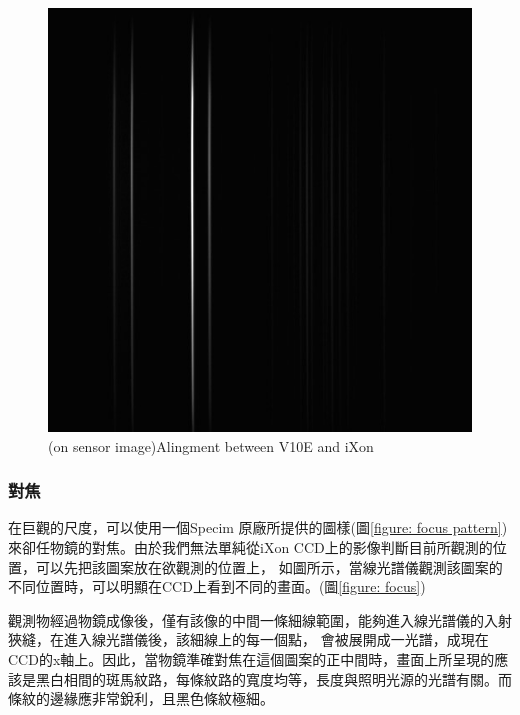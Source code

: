 \documentclass[12pt]{article}
\begin{document}
    \begin{figure}[t]
        \centering
        \includegraphics[width=0.8\linewidth]{0423withoutobf.jpg}
        \caption{(on sensor image)Alingment between V10E and iXon}
        \label{figure: align v10e and ixon}
    \end{figure}

    \subsubsection{對焦}
    在巨觀的尺度，可以使用一個Specim 原廠所提供的圖樣(圖\ref{figure: focus pattern})來卻任物鏡的對焦。由於我們無法單純從iXon CCD上的影像判斷目前所觀測的位置，可以先把該圖案放在欲觀測的位置上，
    如圖所示，當線光譜儀觀測該圖案的不同位置時，可以明顯在CCD上看到不同的畫面。(圖\ref{figure: focus})

    觀測物經過物鏡成像後，僅有該像的中間一條細線範圍，能夠進入線光譜儀的入射狹縫，在進入線光譜儀後，該細線上的每一個點，
    會被展開成一光譜，成現在CCD的x軸上。因此，當物鏡準確對焦在這個圖案的正中間時，畫面上所呈現的應該是黑白相間的斑馬紋路，每條紋路的寬度均等，長度與照明光源的光譜有關。而條紋的邊緣應非常銳利，且黑色條紋極細。
\end{document}
